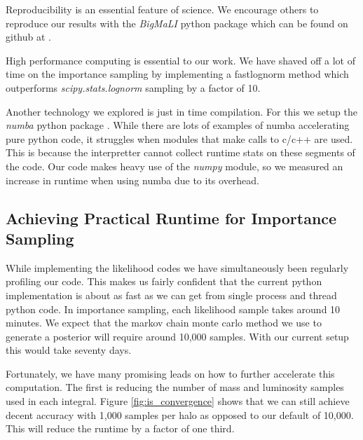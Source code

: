 \documentclass[\docopts]{\docclass}
\begin{document}
Reproducibility is an essential feature of science. We encourage others to reproduce our results with the \emph{BigMaLI} python package which can be found on github at .

High performance computing is essential to our work. We have shaved off a lot of time on the importance sampling by implementing a fastlognorm method which outperforms \emph{scipy.stats.lognorm} sampling by a factor of 10. 

Another technology we explored is just in time compilation. For this we setup the \emph{numba} python package \citep{numba}. While there are lots of examples of numba accelerating pure python code, it struggles when modules that make calls to c/c++ are used. This is because the interpretter cannot collect runtime stats on these segments of the code. Our code makes heavy use of the \emph{numpy} module, so we measured an increase in runtime when using numba due to its overhead.

\subsection{Achieving Practical Runtime for Importance Sampling}
\label{subsec:achieve_runtime}

While implementing the likelihood codes we have simultaneously been regularly profiling our code. This makes us fairly confident that the current python implementation is about as fast as we can get from single process and thread python code. In importance sampling, each likelihood sample takes around 10 minutes. We expect that the markov chain monte carlo method we use to generate a posterior will require around 10,000 samples. With our current setup this would take seventy days.

Fortunately, we have many promising leads on how to further accelerate this computation. The first is reducing the number of mass and luminosity samples used in each integral. Figure \ref{fig:is_convergence} shows that we can still achieve decent accuracy with 1,000 samples per halo as opposed to our default of 10,000. This will reduce the runtime by a factor of one third.
\end{document}
